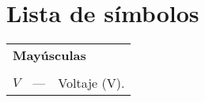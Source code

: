 \chapter*{Lista de símbolos}\label{LDS}

\avisoLocalizacionArchivo

\begin{longtable}{lcp{} }
\multicolumn{3}{l}{\textbf{Mayúsculas}}\\
\\
$V$ & --- & Voltaje (V).\\
\end{longtable}